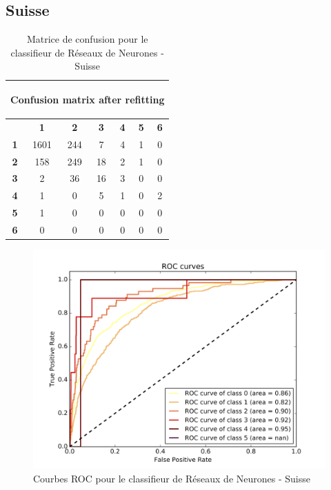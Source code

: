\documentclass{book}
\begin{document}
\subsection{Suisse}

\begin{table}[H]
  \begin{center}
  \begin{adjustbox}{max width=\textwidth}
  \begin{tabular}{|c|c|c|c|c|c|c|}
    \hline
    \multicolumn{7}{|c|}{{ \begin{bf}Confusion matrix after refitting\end{bf}}} \\
    \hline
     & \textbf{1} & \textbf{2} & \textbf{3} & \textbf{4} & \textbf{5} & \textbf{6}\\
    \hline
    \textbf{1} & 1601 & 244 & 7 & 4 & 1 & 0\\
    \hline
    \textbf{2} & 158 & 249 & 18 & 2 & 1 & 0\\
    \hline
    \textbf{3} & 2 & 36 & 16 & 3 & 0 & 0\\
    \hline
    \textbf{4} & 1 & 0 & 5 & 1 & 0 & 2\\
    \hline
    \textbf{5} & 1 & 0 & 0 & 0 & 0 & 0\\
    \hline
    \textbf{6} & 0 & 0 & 0 & 0 & 0 & 0\\
    \hline
  \end{tabular}
  \end{adjustbox}
  \end{center}
  \caption{Matrice de confusion pour le classifieur de Réseaux de Neurones - Suisse}
  \label{nn_cm_suisse}
\end{table}

\begin{figure}[H]
 \begin{center}
\includegraphics[scale=0.4]{../../data/Suisse/test/Neural_Network_Classification-oversampling/Neural_Network_Classification-oversampling_roc.png}
 \end{center}
 \caption{Courbes ROC pour le classifieur de Réseaux de Neurones - Suisse}
 \label{nn_roc_suisse}
\end{figure}
\end{document}
